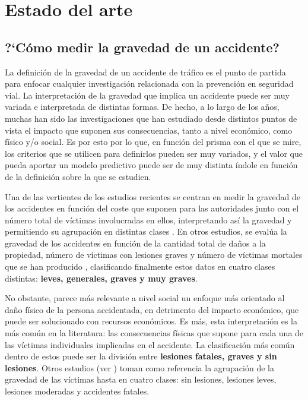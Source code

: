     \chapter{Estado del arte}

\section{?`Cómo medir la gravedad de un accidente?}

La definición de la gravedad de un accidente de tráfico es el punto de partida para enfocar cualquier investigación relacionada con la prevención en seguridad vial. La interpretación de la gravedad que implica un accidente puede ser muy variada e interpretada de distintas formas. De hecho, a lo largo de los años, muchas han sido las investigaciones que han estudiado desde distintos puntos de vista el impacto que suponen sus consecuencias, tanto a nivel económico, como físico y/o social. Es por esto por lo que, en función del prisma con el que se mire, los criterios que se utilicen para definirlos pueden ser muy variados, y el valor que pueda aportar un modelo predictivo puede ser de muy distinta índole en función de la definición sobre la que se estudien.


Una de las vertientes de los estudios recientes se centran en medir la gravedad de los accidentes en función del coste que suponen para las autoridades junto con el número total de víctimas involucradas en ellos, interpretando así la gravedad y permitiendo su agrupación en distintas clases \cite{app7060476}. En otros estudios, se evalúa la gravedad de los accidentes en función de la cantidad total de daños a la propiedad, número de víctimas con lesiones graves y número de víctimas mortales que se han producido \cite{Yang2023}, clasificando finalmente estos datos en cuatro clases distintas: \textbf{leves, generales, graves y muy graves}.

No obstante, parece más relevante a nivel social un enfoque más orientado al daño físico de la persona accidentada, en detrimento del impacto económico, que puede ser solucionado con recursos económicos. Es más, esta interpretación es la más común en la literatura: las consecuencias físicas que supone para cada una de las víctimas individuales implicadas en el accidente. La clasificación más común dentro de estos puede ser la división entre \textbf{lesiones fatales, graves y sin lesiones}. Otros estudios (ver \cite{panicker2022injury}) toman como referencia la agrupación de la gravedad de las víctimas hasta en cuatro clases: sin lesiones, lesiones leves, lesiones moderadas y accidentes fatales.

